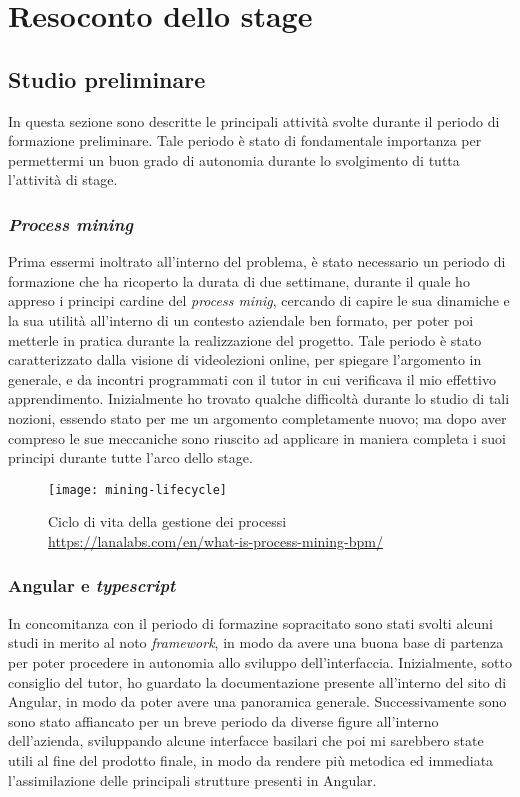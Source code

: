 
\chapter{Resoconto dello stage}
\label{cap:Resoconto dello stage}



\section{Studio preliminare}
In questa sezione sono descritte le principali attività svolte durante il periodo di formazione preliminare. Tale periodo è stato di fondamentale importanza per permettermi un buon grado di autonomia durante lo svolgimento di tutta l'attività di stage.
\subsection{\textit{Process mining}}
Prima essermi inoltrato all'interno del problema, è stato necessario un periodo di formazione che ha ricoperto la durata di due settimane, durante il quale ho appreso i principi cardine del \textit{process minig}, cercando di capire le sua dinamiche e la sua utilità all'interno di un contesto aziendale ben formato, per poter poi metterle in pratica durante la realizzazione del progetto. Tale periodo è stato caratterizzato dalla visione di videolezioni online, per spiegare l'argomento in generale, e da incontri programmati con il tutor in cui verificava il mio effettivo apprendimento. Inizialmente ho trovato qualche difficoltà durante lo studio di tali nozioni, essendo stato per me un argomento completamente nuovo; ma dopo aver compreso le sue meccaniche sono riuscito ad applicare in maniera completa i suoi principi durante tutte l'arco dello stage.
\begin{figure}[!h] 
	\centering 
	\texttt{[image: mining-lifecycle]} 
	\caption{Ciclo di vita della gestione dei processi \url{https://lanalabs.com/en/what-is-process-mining-bpm/}}
\end{figure}

\subsection{Angular e \textit{typescript}}
In concomitanza con il periodo di formazine sopracitato sono stati svolti alcuni studi in merito al noto \textit{framework}, in modo da avere una buona base di partenza per poter procedere in autonomia allo sviluppo dell'interfaccia. Inizialmente, sotto consiglio del tutor, ho guardato la documentazione presente all'interno del sito di Angular, in modo da poter avere una panoramica generale. Successivamente sono sono stato affiancato per un breve periodo da diverse figure all'interno dell'azienda, sviluppando alcune interfacce basilari che poi mi sarebbero state utili al fine del prodotto finale, in modo da rendere più metodica ed immediata l'assimilazione delle principali strutture presenti in Angular.
\newpage

